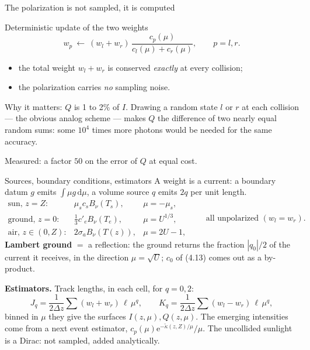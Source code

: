\documentclass[aspectratio=169,10pt]{beamer}
\renewcommand{\d}{\,\mathrm{d}}
\newcommand{\e}{\mathrm{e}}
\newcommand{\skappa}{\tilde\kappa}
\begin{document}
\begin{frame}{The polarization is not sampled, it is computed}
\begin{block}{Deterministic update of the two weights}
\[
w_p\ \longleftarrow\ (w_l+w_r)\,\frac{c_p(\mu)}{c_l(\mu)+c_r(\mu)},\qquad p=l,r .
\]
\end{block}
\begin{itemize}
\item the total weight $w_l+w_r$ is conserved \emph{exactly} at every collision;
\item the polarization carries \emph{no} sampling noise.
\end{itemize}
\medskip

Why it matters: $Q$ is 1 to 2\% of $I$. Drawing a random state $l$ or $r$ at each
collision --- the obvious analog scheme --- makes $Q$ the difference of two nearly equal
random sums: some $10^4$ times more photons would be needed for the same accuracy.
\medskip

Measured: a factor $50$ on the error of $Q$ at equal cost.
\end{frame}

\begin{frame}{Sources, boundary conditions, estimators}
A weight is a current: a boundary datum $g$ emits $\int\mu g\d\mu$, a volume source $q$
emits $2q$ per unit length.
\[
\begin{array}{lll}
\text{sun, } z=Z: & \mu_sc_sB_\nu(T_s), & \mu=-\mu_s,\\[2pt]
\text{ground, } z=0: & \tfrac13c'_eB_\nu(T_e), & \mu=U^{1/3},\\[2pt]
\text{air, } z\in(0,Z): & 2\sigma_aB_\nu(T(z)), & \mu=2U-1,
\end{array}
\qquad\text{all unpolarized } (w_l=w_r).
\]
\textbf{Lambert ground} $=$ a reflection: the ground returns the fraction $|q_0|/2$ of the
current it receives, in the direction $\mu=\sqrt U$; $c_0$ of (4.13) comes out as a
by-product.
\medskip

\textbf{Estimators.} Track lengths, in each cell, for $q=0,2$:
\[
J_q=\frac1{2\Delta z}\sum (w_l+w_r)\,\ell\,\mu^q,\qquad
K_q=\frac1{2\Delta z}\sum (w_l-w_r)\,\ell\,\mu^q ,
\]
binned in $\mu$ they give the surfaces $I(z,\mu),Q(z,\mu)$. The emerging intensities come
from a next event estimator, $c_p(\mu)\e^{-\skappa(z,Z)/\mu}/\mu$. The uncollided sunlight
is a Dirac: not sampled, added analytically.
\end{frame}
\end{document}
